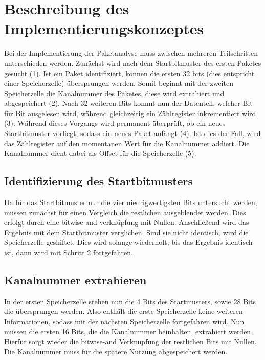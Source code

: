 \documentclass[12pt,titlepage,german,a4]{article}
\begin{document}
    \newpage

    \section{Beschreibung des Implementierungskonzeptes}
    Bei der Implementierung der Paketanalyse muss zwischen mehreren Teilschritten unterschieden werden. Zun{\"a}chst wird nach dem Startbitmuster des ersten Paketes gesucht (1). Ist ein Paket identifiziert, k{\"o}nnen die ersten 32 bits (dies entspricht einer Speicherzelle) {\"u}bersprungen werden. Somit beginnt mit der zweiten Speicherzelle die Kanalnummer des Paketes, diese wird extrahiert und abgespeichert (2). Nach 32 weiteren Bits kommt nun der Datenteil, welcher Bit f{\"u}r Bit ausgelesen wird, w{\"a}hrend gleichzeitig ein Z{\"a}hlregister inkrementiert wird (3). W{\"a}hrend dieses Vorgangs wird permanent {\"u}berpr{\"u}ft, ob ein neues Startbitmuster vorliegt, sodass ein neues Paket anf{\"a}ngt (4). Ist dies der Fall, wird das Z{\"a}hlregister auf den momentanen Wert f{\"u}r die Kanalnummer addiert. Die Kanalnummer dient dabei als Offset f{\"u}r die Speicherzelle (5).

    \subsection{Identifizierung des Startbitmusters}
    Da f{\"u}r das Startbitmuster nur die vier niedrigwertigsten Bits untersucht werden, m{\"u}ssen zun{\"a}chst f{\"u}r einen Vergleich die restlichen ausgeblendet werden. Dies erfolgt durch eine bitwise-and verkn{\"u}pfung mit Nullen. Anschlie{\ss}end wird das Ergebnis mit dem Startbitmuster verglichen. Sind sie nicht identisch, wird die Speicherzelle geshiftet. Dies wird solange wiederholt, bis das Ergebnis identisch ist, dann wird mit Schritt 2 fortgefahren.

    \subsection{Kanalnummer extrahieren}
    In der ersten Speicherzelle stehen nun die 4 Bits des Startmusters, sowie 28 Bits die {\"u}bersprungen werden. Also enth{\"a}lt die erste Speicherzelle keine weiteren Informationen, sodass mit der n{\"a}chsten Speicherzelle fortgefahren wird. Nun m{\"u}ssen die ersten 16 Bits, die die Kanalnummer beinhalten, extrahiert werden. Hierf{\"u}r sorgt wieder die bitwise-and Verkn{\"u}pfung der restlichen Bits mit Nullen. Die Kanalnummer muss f{\"u}r die sp{\"a}tere Nutzung abgespeichert werden.
\end{document}
